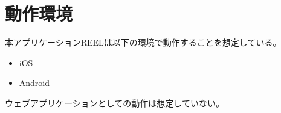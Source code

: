 \section{動作環境}
本アプリケーションREELは以下の環境で動作することを想定している。
\begin{itemize}
  \item iOS
  \item Android
\end{itemize}
ウェブアプリケーションとしての動作は想定していない。